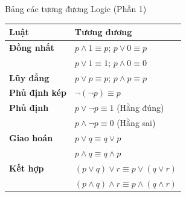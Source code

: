 \documentclass[aspectratio=169, 11pt]{beamer}
\begin{document}
\begin{frame}{Bảng các tương đương Logic (Phần 1)}
\vspace{-0.1cm}
\begin{center}
\renewcommand{\arraystretch}{1.1}
\begin{tabular}{ll}
\toprule
\textbf{Luật} & \textbf{Tương đương} \\
\midrule
\textbf{Đồng nhất} & $p \land 1 \equiv p$; $p \lor 0 \equiv p$ \\
                   & $p \lor 1 \equiv 1$; $p \land 0 \equiv 0$ \\
\textbf{Lũy đẳng}  & $p \lor p \equiv p$; $p \land p \equiv p$ \\
\textbf{Phủ định kép} & $\neg(\neg p) \equiv p$ \\
\textbf{Phủ định}  & $p \lor \neg p \equiv 1$ (Hằng đúng) \\
                   & $p \land \neg p \equiv 0$ (Hằng sai) \\
\textbf{Giao hoán} & $p \lor q \equiv q \lor p$ \\
                   & $p \land q \equiv q \land p$ \\
\textbf{Kết hợp}   & $(p \lor q) \lor r \equiv p \lor (q \lor r)$ \\
                   & $(p \land q) \land r \equiv p \land (q \land r)$ \\
\bottomrule
\end{tabular}
\end{center}
\end{frame}
\end{document}

